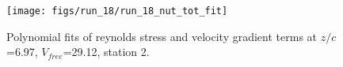 \begin{figure}[H]
\centering
\texttt{[image: figs/run\_18/run\_18\_nut\_tot\_fit]}
\caption{Polynomial fits of reynolds stress and velocity gradient terms at $z/c$=6.97, $V_{free}$=29.12, station 2.}
\label{fig:run_18_nut_tot_fit}
\end{figure}


